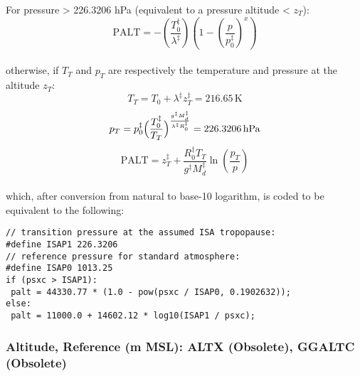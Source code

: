 \documentclass[
  english,
]{book}
\begin{document}
For pressure \textgreater{} 226.3206 hPa (equivalent to a pressure altitude \textless{} \(z_{T}\)):
\begin{equation}
\mathrm{PALT}=-\left(\frac{T_{0}^{\ddagger}}{\lambda^{\ddagger}}\right)\left(1-\left(\frac{p}{p_{0}^{\ddagger}}\right)^{x}\right)
\label{eq:PALT1}
\end{equation}\\
otherwise, if \(T_{T}\)
and \(p_{T}\)
are respectively the temperature and pressure at the altitude \(z_{T}\):\\
\[T_{T}=T_{0}+\lambda^{\ddagger}z_{T}^{\ddagger}=216.65\,\mathrm{K}\]
\[p_{T}=p_{0}^{\ddagger}\Bigl(\frac{T_{0}^{\ddagger}}{T_{T}}\Bigr)^{\frac{g^{\ddagger}M_{d}^{\ddagger}}{\lambda^{\ddagger}R_{0}^{\ddagger}}}=226.3206\,\mathrm{hPa}\]
\begin{equation}
\mathrm{PALT}=z_{T}^{\ddagger}+\frac{R_{0}^{\ddagger}T_{T}}{g^{\ddagger}M_{d}^{\ddagger}}\ln\left(\frac{p_{T}}{p}\right)
\label{eq:PALT2}
\end{equation}\\
which, after conversion from natural to base-10 logarithm, is coded
to be equivalent to the following:

\begin{verbatim}
// transition pressure at the assumed ISA tropopause:
#define ISAP1 226.3206
// reference pressure for standard atmosphere:
#define ISAP0 1013.25
if (psxc > ISAP1):
 palt = 44330.77 * (1.0 - pow(psxc / ISAP0, 0.1902632));
else:
 palt = 11000.0 + 14602.12 * log10(ISAP1 / psxc);
\end{verbatim}

\hypertarget{altx}{%
\subsubsection*{Altitude, Reference (m MSL): ALTX (Obsolete), GGALTC (Obsolete)}\label{altx}}
\end{document}
